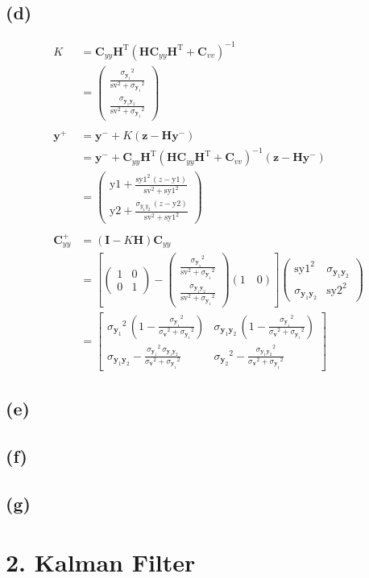 \documentclass[fleqn, letterpaper]{tufte-handout}
\newcommand{\T}{^\text{T}}
\newcommand{\y}{\mathbf{y}}
\newcommand{\z}{\mathbf{z}}
\newcommand{\I}{\mathbf{I}}
\newcommand{\HH}{\mathbf{H}}
\newcommand{\vecv}{\mathbf{v}}
\newcommand{\cyy}{\mathbf{C}_{yy}}
\newcommand{\cvv}{\mathbf{C}_{vv}}
\newcommand{\KK}{\left(\begin{array}{c} \frac{{\sigma_{\y_1}}^2}{{\mathrm{sv}}^2 + {\sigma_{\y_1}}^2}\\ \frac{\sigma_{\y_1\y_2}}{{\mathrm{sv}}^2 + {\sigma_{\y_1}}^2} \end{array}\right)}
\newcommand{\cyylong}{\left(\begin{array}{cc} {\mathrm{sy1}}^2 & \sigma_{\y_1\y_2}\\ \sigma_{\y_1\y_2} & {\mathrm{sy2}}^2 \end{array}\right)}
\begin{document}
\subsection{(d)}
\begin{align*}
K &= \cyy \HH\T(\HH\cyy\HH\T+\cvv)^{-1} \\
&= \KK\\ \\
\y^+ &= \y^- + K(\z-\HH\y^-) \\
&= \y^- + \cyy \HH\T(\HH\cyy\HH\T+\cvv)^{-1}(\z-\HH\y^-) \\ 
&= \left(\begin{array}{c} \mathrm{y1} + \frac{{\mathrm{sy1}}^2\, \left(z - \mathrm{y1}\right)}{{\mathrm{sv}}^2 + {\mathrm{sy1}}^2}\\ \mathrm{y2} + \frac{\sigma_{y_1y_2}\, \left(z - \mathrm{y2}\right)}{{\mathrm{sv}}^2 + {\mathrm{sy1}}^2} \end{array}\right)\\ \\
\cyy^+  &= \left(\I - K\HH\right)\cyy\\
&= \left[\left(\begin{array}{cc} 1 & 0\\ 0 & 1 \end{array}\right) - \KK (1\quad 0)\right]\cyylong\\
&= \left[\begin{array}{cc}
 {\sigma_{\y_1}}^2\, \left(1 -\frac{{\sigma_{\y_1}}^2}{{\sigma_\vecv}^2 + {\sigma_{\y_1}}^2}\right) 
 &  \sigma_{\y_1\y_2}\, \left(1-\frac{{\sigma_{\y_1}}^2}{{\sigma_\vecv}^2 + {\sigma_{\y_1}}^2}\right)\\
  \sigma_{\y_1\y_2} - \frac{{\sigma_{\y_1}}^2\, \sigma_{\y_1\y_2}}{{\sigma_\vecv}^2 + {\sigma_{\y_1}}^2} 
  & {\sigma_{\y_2}}^2 - \frac{{\sigma_{\y_1\y_2}}^2}{{\sigma_\vecv}^2 + {\sigma_{\y_1}}^2} \end{array}\right]
\end{align*}
\subsection{(e)}
\subsection{(f)}
\subsection{(g)}

\section{2. Kalman Filter}
\end{document}
